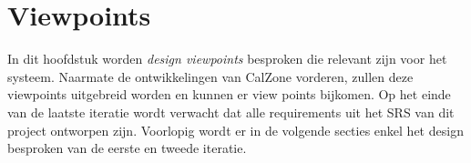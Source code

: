 \chapter{Viewpoints}
\label{chap:viewpoints}

In dit hoofdstuk worden \emph{design viewpoints} besproken die relevant zijn voor het systeem. 
Naarmate de ontwikkelingen van CalZone vorderen, zullen deze viewpoints uitgebreid worden en kunnen er view points bijkomen. 
Op het einde van de laatste iteratie wordt verwacht dat alle requirements uit het SRS van dit project ontworpen zijn. 
Voorlopig wordt er in de volgende secties enkel het design besproken van de eerste en tweede iteratie.





